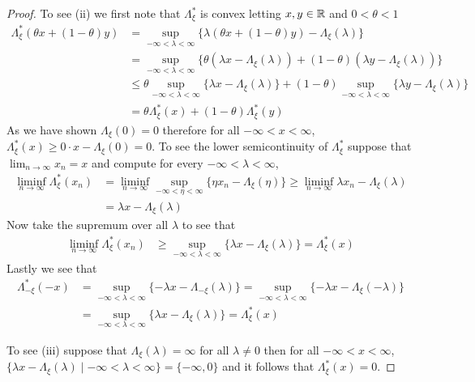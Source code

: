 \begin{proof}
To see (ii) we first note that $\Lambda_\xi^*$ is convex letting $x,y \in \mathbb{R}$ and $0 < \theta < 1$
\begin{align*}
\Lambda_\xi^*(\theta x + (1-\theta)y) &= \sup_{-\infty < \lambda < \infty} \lbrace \lambda (\theta x + (1-\theta)y) - \Lambda_\xi(\lambda) \rbrace \\
&= \sup_{-\infty < \lambda < \infty} \lbrace \theta (\lambda x - \Lambda_\xi(\lambda) ) + (1-\theta)( \lambda y - \Lambda_\xi(\lambda)) \rbrace \\
&\leq \theta \sup_{-\infty < \lambda < \infty} \lbrace \lambda x - \Lambda_\xi(\lambda) \rbrace + (1-\theta) \sup_{-\infty < \lambda < \infty} \lbrace   \lambda y - \Lambda_\xi(\lambda) \rbrace \\
&=\theta \Lambda_\xi^*(x) + (1-\theta) \Lambda_\xi^*(y)
\end{align*}
As we have shown $\Lambda_\xi(0) = 0$ therefore for all $-\infty < x < \infty$, $\Lambda_\xi^*(x) \geq 0 \cdot x - \Lambda_\xi(0) = 0$.  To see the lower semicontinuity of $\Lambda_\xi^*$ suppose that $\lim_{n \to \infty} x_n = x$ and compute for every $-\infty < \lambda < \infty$,
\begin{align*}
\liminf_{n \to \infty} \Lambda_\xi^*(x_n) 
&= \liminf_{n \to \infty} \sup_{-\infty < \eta < \infty} \lbrace \eta x_n - \Lambda_\xi(\eta) \rbrace 
\geq \liminf_{n \to \infty} \lambda x_n - \Lambda_\xi(\lambda) \\
&= \lambda x - \Lambda_\xi(\lambda) 
\end{align*}
Now take the supremum over all $\lambda$ to see that 
\begin{align*}
\liminf_{n \to \infty} \Lambda_\xi^*(x_n)  &\geq \sup_{-\infty < \lambda < \infty} \lbrace \lambda x - \Lambda_\xi(\lambda)  \rbrace = \Lambda_\xi^*(x)
\end{align*}
Lastly we see that
\begin{align*}
\Lambda_{-\xi}^*(-x)  &= \sup_{-\infty < \lambda < \infty} \lbrace -\lambda x - \Lambda_{-\xi}(\lambda) \rbrace = \sup_{-\infty < \lambda < \infty} \lbrace -\lambda x - \Lambda_{\xi}(-\lambda) \rbrace \\
&= \sup_{-\infty < \lambda < \infty} \lbrace \lambda x - \Lambda_{\xi}(\lambda) \rbrace = \Lambda_{\xi}^*(x)  
\end{align*}

To see (iii) suppose that $\Lambda_\xi(\lambda) = \infty$ for all $\lambda \neq 0$ then for all $-\infty < x < \infty$, $\lbrace \lambda x - \Lambda_\xi(\lambda) \mid -\infty < \lambda < \infty \rbrace = \lbrace -\infty, 0 \rbrace$ and it follows that $\Lambda_\xi^*(x) = 0$.  


\end{proof}
